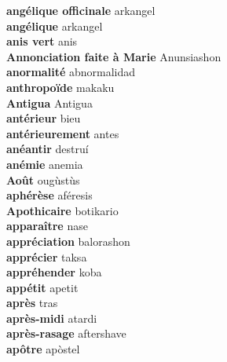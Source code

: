 \textbf{ angélique officinale  } arkangel \\
\textbf{ angélique  } arkangel \\
\textbf{ anis vert  } anis \\
\textbf{ Annonciation faite à Marie  } Anunsiashon \\
\textbf{ anormalité  } abnormalidad \\
\textbf{ anthropoïde  } makaku \\
\textbf{ Antigua  } Antigua \\
\textbf{ antérieur  } bieu \\
\textbf{ antérieurement  } antes \\
\textbf{ anéantir  } destruí \\
\textbf{ anémie  } anemia \\
\textbf{ Août  } ougùstùs \\
\textbf{ aphérèse  } aféresis \\
\textbf{ Apothicaire  } botikario \\
\textbf{ apparaître  } nase \\
\textbf{ appréciation  } balorashon \\
\textbf{ apprécier  } taksa \\
\textbf{ appréhender  } koba \\
\textbf{ appétit  } apetit \\
\textbf{ après  } tras \\
\textbf{ après-midi  } atardi \\
\textbf{ après-rasage  } aftershave \\
\textbf{ apôtre  } apòstel \\
